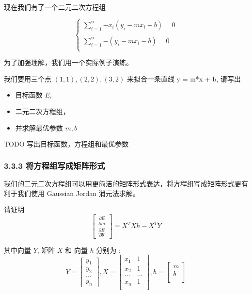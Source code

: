 \documentclass[11pt]{article}
\providecommand{\tightlist}{%
      \setlength{\itemsep}{0pt}\setlength{\parskip}{0pt}}
\begin{document}
现在我们有了一个二元二次方程组

\[
\begin{cases}
\displaystyle
\sum_{i=1}^{n}{-x_i(y_i - mx_i - b)} =0 \\
\\
\displaystyle
\sum_{i=1}^{n}{-(y_i - mx_i - b)} =0 \\
\end{cases}
\]

为了加强理解，我们用一个实际例子演练。

我们要用三个点 \((1,1), (2,2), (3,2)\) 来拟合一条直线 y = m*x + b,
请写出

\begin{itemize}
\tightlist
\item
  目标函数 \(E\),
\item
  二元二次方程组，
\item
  并求解最优参数 \(m, b\)
\end{itemize}

    TODO 写出目标函数，方程组和最优参数

    \subsubsection{3.3.3
将方程组写成矩阵形式}\label{ux5c06ux65b9ux7a0bux7ec4ux5199ux6210ux77e9ux9635ux5f62ux5f0f}

我们的二元二次方程组可以用更简洁的矩阵形式表达，将方程组写成矩阵形式更有利于我们使用
Gaussian Jordan 消元法求解。

请证明 \[
\begin{bmatrix}
    \frac{\partial E}{\partial m} \\
    \frac{\partial E}{\partial b} 
\end{bmatrix} = X^TXh - X^TY
\]

其中向量 \(Y\), 矩阵 \(X\) 和 向量 \(h\) 分别为 : \[
Y =  \begin{bmatrix}
    y_1 \\
    y_2 \\
    ... \\
    y_n
\end{bmatrix}
,
X =  \begin{bmatrix}
    x_1 & 1 \\
    x_2 & 1\\
    ... & ...\\
    x_n & 1 \\
\end{bmatrix},
h =  \begin{bmatrix}
    m \\
    b \\
\end{bmatrix}
\]
\end{document}
